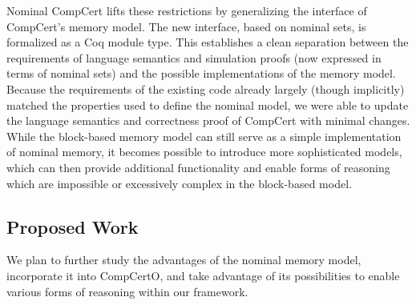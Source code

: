 Nominal CompCert \cite{wang2022}
lifts these restrictions
by generalizing the interface of
CompCert's memory model.
The new interface,
based on nominal sets,
is formalized as a Coq module type.
%
This establishes a clean separation between
the requirements of language semantics and simulation proofs
(now expressed in terms of nominal sets)
and the possible implementations of the memory model.
Because the requirements of the existing code
already largely (though implicitly) matched
the properties used to define the nominal model,
we were able to update
the language semantics and correctness proof of CompCert
with minimal changes.
While the block-based memory model
can still serve as a simple implementation of nominal memory,
it becomes possible to introduce
more sophisticated models,
which can then provide additional functionality
and enable forms of reasoning
which are impossible
or excessively complex in the block-based model.

\subsection{Proposed Work}

We plan to
further study the advantages of the nominal memory model,
incorporate it into CompCertO,
and take advantage of its possibilities
to enable various forms of reasoning
within our framework.


\vspace*{-2ex}
